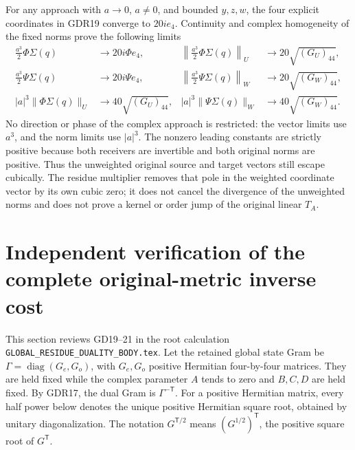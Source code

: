 \documentclass[11pt]{article}
\newcommand{\diag}{\operatorname{diag}}
\begin{document}
For any approach with $a\to0$, $a\ne0$, and bounded
$y,z,w$, the four explicit coordinates in GDR19 converge to
$20ie_4$. Continuity and complex homogeneity of the fixed
norms prove the following limits
\begin{equation}
 \begin{aligned}
 \frac{a^3}{2}\Phi\Sigma(q)&\longrightarrow20i\Phi e_4,
 &\left\|\frac{a^3}{2}\Phi\Sigma(q)\right\|_U
     &\longrightarrow20\sqrt{(G_U)_{44}},\\
 \frac{a^3}{2}\Psi\Sigma(q)&\longrightarrow20i\Psi e_4,
 &\left\|\frac{a^3}{2}\Psi\Sigma(q)\right\|_W
     &\longrightarrow20\sqrt{(G_W)_{44}},\\
 |a|^3\|\Phi\Sigma(q)\|_U&\longrightarrow40\sqrt{(G_U)_{44}},
 &|a|^3\|\Psi\Sigma(q)\|_W
     &\longrightarrow40\sqrt{(G_W)_{44}}.
 \end{aligned}
 \tag{GDR22}
\end{equation}
No direction or phase of the complex approach is restricted:
the vector limits use $a^3$, and the norm limits use
$|a|^3$. The nonzero leading constants are strictly positive
because both receivers are invertible and both original
norms are positive. Thus the unweighted original source and
target vectors still escape cubically. The residue multiplier
removes that pole in the weighted coordinate vector by its
own cubic zero; it does not cancel the divergence of the
unweighted norms and does not prove a kernel or order jump
of the original linear $T_A$.

\section{Independent verification of the complete original-metric inverse cost}
This section reviews GD19--21 in the root calculation
\texttt{GLOBAL\_RESIDUE\_DUALITY\_BODY.tex}. Let the retained
global state Gram be $\Gamma=\diag(G_e,G_o)$, with $G_e,G_o$
positive Hermitian four-by-four matrices. They are held fixed
while the complex parameter $A$ tends to zero and $B,C,D$
are held fixed. By GDR17, the dual Gram is $\Gamma^{-\mathsf T}$.
For a positive Hermitian matrix, every half power below denotes
the unique positive Hermitian square root, obtained by unitary
diagonalization. The notation $G^{\mathsf T/2}$ means
$(G^{1/2})^{\mathsf T}$, the positive square root of
$G^{\mathsf T}$.
\end{document}
